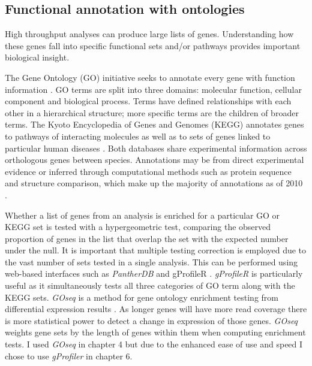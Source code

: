 \subsection{Functional annotation with ontologies}

High throughput analyses can produce large lists of genes.
Understanding how these genes fall into specific functional sets and/or pathways provides important biological insight.

The Gene Ontology (GO) initiative seeks to annotate every gene with function information \citep{Ashburner2000,Carbon2017}.
GO terms are split into three domains: molecular function, cellular component and biological process. 
Terms have defined relationships with each other in a hierarchical structure; more specific terms are the children of broader terms.
The Kyoto Encyclopedia of Genes and Genomes (KEGG) annotates genes to pathways of interacting molecules as well as to sets of genes linked to particular human diseases \citep{Ogata1999}.
Both databases share experimental information across orthologous genes between species.
Annotations may be from direct experimental evidence or inferred through computational methods such as protein sequence and structure comparison, which make up the majority of annotations as of 2010 \citep{DuPlessis2011}.

Whether a list of genes from an analysis is enriched for a particular GO or KEGG set is tested with a hypergeometric test, comparing the observed proportion of genes in the list that overlap the set with the expected number under the null.
It is important that multiple testing correction is employed due to the vast number of sets tested in a single analysis.
This can be performed using web-based interfaces such as \textit{PantherDB} \citep{Thomas2003} and gProfileR \citep{Reimand2016}.
\textit{gProfileR} is particularly useful as it simultaneously tests all three categories of GO term along with the KEGG sets.
\textit{GOseq} is a method for gene ontology enrichment testing from differential expression results \citep{Young2010}. As longer genes will have more read coverage there is more statistical power to detect a change in expression of those genes. \textit{GOseq} weights gene sets by the length of genes within them when computing enrichment tests. I used \textit{GOseq} in chapter 4 but due to the enhanced ease of use and speed I chose to use \textit{gProfiler} in chapter 6.

